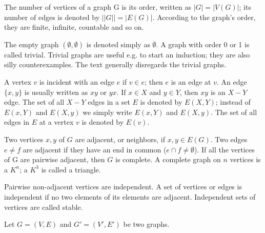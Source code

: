 \documentclass{article}
\begin{document}
The number of vertices of a graph G is its order,
written as $|G| = |V(G)|$; its number of edges
is denoted by $||G|| = |E(G)|$. According to the graph's
order, they are finite, infinite, countable and so on.

The empty graph $(\emptyset, \emptyset)$ is
denoted simply as $\emptyset$. A graph with order
0 or 1 is called trivial. Trivial graphs are useful
e.g. to start an induction; they are also silly
counterexamples. The text generally disregards
the trivial graphs.

A vertex $v$ is incident with an edge $e$ if $v \in e$;
then $e$ is an edge at $v$. An edge $\{x, y\}$
is usually written as $xy$ or $yx$. If $x \in X$
and $y \in Y$, then $xy$ is an $X-Y$ edge. The
set of all $X-Y$ edges in a set $E$ is denoted by
$E(X, Y)$; instead of $E({x}, Y)$ and $E(X, {y})$
we simply write $E(x, Y)$ and $E(X, y)$. The
set of all edges in $E$ at a vertex $v$ is denoted
by $E(v)$.

Two vertices $x, y$ of $G$ are adjacent, or neighbors,
if ${x, y} \in E(G)$. Two edges $e \neq f$ are
adjacent if they have an end in common
($e \cap f \neq \emptyset$). If all the vertices
of G are pairwise adjacent, then $G$ is complete.
A complete graph on $n$ vertices is a $K^n$;
a $K^3$ is called a triangle.

Pairwise non-adjacent vertices are independent.
A set of vertices or edges is independent if
no two elements of its elements are adjacent.
Independent sets of vertices are called stable.

Let $G = (V, E)$ and $G' = (V', E')$ be two graphs.
\end{document}
